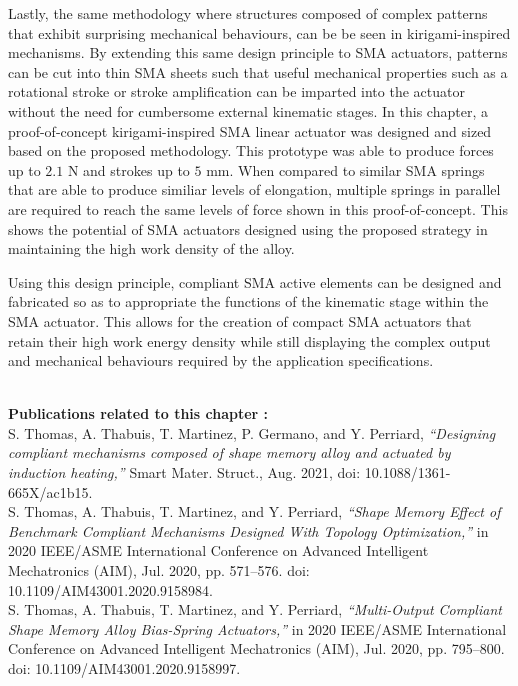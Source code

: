 Lastly, the same methodology where structures composed of complex patterns that exhibit surprising mechanical behaviours, can be be seen in kirigami-inspired mechanisms. By extending this same design principle to SMA actuators, patterns can be cut into thin SMA sheets such that useful mechanical properties such as a rotational stroke or stroke amplification can be imparted into the actuator without the need for cumbersome external kinematic stages. In this chapter, a proof-of-concept kirigami-inspired SMA linear actuator was designed and sized based on the proposed methodology. This prototype was able to produce forces up to $2.1$ N and strokes up to $5$ mm. When compared to similar SMA springs that are able to produce similiar levels of elongation, multiple springs in parallel are required to reach the same levels of force shown in this proof-of-concept. This shows the potential of SMA actuators designed using the proposed strategy in maintaining the high work density of the alloy.

Using this design principle, compliant SMA active elements can be designed and fabricated so as to appropriate the functions of the kinematic stage within the SMA actuator. This allows for the creation of compact SMA actuators that retain their high work energy density while still displaying the complex output and mechanical behaviours required by the application specifications.


\vspace*{\fill}
\noindent\hrulefill \\
\textbf{\large Publications related to this chapter :}\\

S. Thomas, A. Thabuis, T. Martinez, P. Germano, and Y. Perriard, \textit{“Designing compliant mechanisms composed of shape memory alloy and actuated by induction heating,”} Smart Mater. Struct., Aug. 2021, doi: 10.1088/1361-665X/ac1b15.\\

S. Thomas, A. Thabuis, T. Martinez, and Y. Perriard, \textit{“Shape Memory Effect of Benchmark Compliant Mechanisms Designed With Topology Optimization,”} in 2020 IEEE/ASME International Conference on Advanced Intelligent Mechatronics (AIM), Jul. 2020, pp. 571–576. doi: 10.1109/AIM43001.2020.9158984.\\

S. Thomas, A. Thabuis, T. Martinez, and Y. Perriard, \textit{“Multi-Output Compliant Shape Memory Alloy Bias-Spring Actuators,”} in 2020 IEEE/ASME International Conference on Advanced Intelligent Mechatronics (AIM), Jul. 2020, pp. 795–800. doi: 10.1109/AIM43001.2020.9158997.\\

